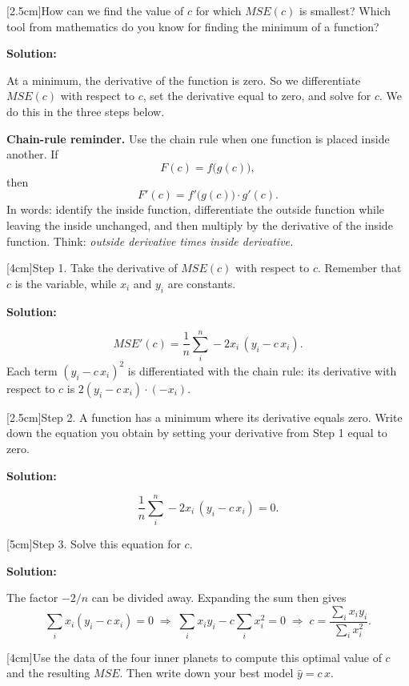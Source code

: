 \documentclass[12pt]{article}
\makeatletter
\newcounter{question}
\newlength\questionheight
\newcommand{\question}{\@ifstar{\question@text}{\question@field}}
\newcommand{\question@heading}[1]{%
  \refstepcounter{question}%
  \vspace{0.3cm}%
  \noindent\textbf{\faEdit\ Question \thequestion: #1}%
}
\newcommand{\question@text}[1]{%
  \question@heading{#1}%
}
\newcommand{\question@field}[2][\questionheight]{%
  \question@heading{#2}%
 \\[0.3em] \begin{Form}
    \TextField[
      name=Q\thequestion,
      multiline=true,
      width=\linewidth,
      height=#1,
      charsize=10pt,
      bordercolor={0 0 0},
      borderwidth=1.8,
      backgroundcolor={1 1 1}
    ]{}
  \end{Form}
  \vspace{0.3cm}%
}
\newenvironment{solution}{%
  \begin{solutionbox}\textbf{Solution:}
}{%
  \end{solutionbox}
}
\makeatother
\begin{document}
\question[2.5cm]{How can we find the value of $c$ for which $MSE(c)$ is smallest? Which tool from mathematics do you know for finding the minimum of a function?}

\begin{solution}
At a minimum, the derivative of the function is zero. So we differentiate $MSE(c)$ with respect to $c$, set the derivative equal to zero, and solve for $c$. We do this in the three steps below.
\end{solution}

\begin{importantbox}
\textbf{Chain-rule reminder.} Use the chain rule when one function is placed inside another. If
\[
    F(c)=f\bigl(g(c)\bigr),
\]
then
\[
    F'(c)=f'\bigl(g(c)\bigr)\cdot g'(c).
\]
In words: identify the inside function, differentiate the outside function while leaving the inside unchanged, and then multiply by the derivative of the inside function. Think: \emph{outside derivative times inside derivative.}
\end{importantbox}

\question[4cm]{Step 1. Take the derivative of $MSE(c)$ with respect to $c$. Remember that $c$ is the variable, while $x_i$ and $y_i$ are constants.}

\begin{solution}
$$MSE'(c) = \frac{1}{n}\sum_i^n -2x_i\,(y_i - c\,x_i).$$
Each term $(y_i - c\,x_i)^2$ is differentiated with the chain rule: its derivative with respect to $c$ is $2(y_i - c\,x_i)\cdot(-x_i)$.
\end{solution}

\question[2.5cm]{Step 2. A function has a minimum where its derivative equals zero. Write down the equation you obtain by setting your derivative from Step 1 equal to zero.}

\begin{solution}
$$\frac{1}{n}\sum_i^n -2x_i\,(y_i - c\,x_i) = 0.$$
\end{solution}

\question[5cm]{Step 3. Solve this equation for $c$.}

\begin{solution}
The factor $-2/n$ can be divided away. Expanding the sum then gives
$$\sum_i x_i(y_i - c\,x_i) = 0 \;\Longrightarrow\; \sum_i x_i y_i - c\sum_i x_i^2 = 0 \;\Longrightarrow\; c = \frac{\sum_i x_i y_i}{\sum_i x_i^2}.$$
\end{solution}

\question[4cm]{Use the data of the four inner planets to compute this optimal value of $c$ and the resulting $MSE$. Then write down your best model $\hat{y} = c\,x$.}
\end{document}
